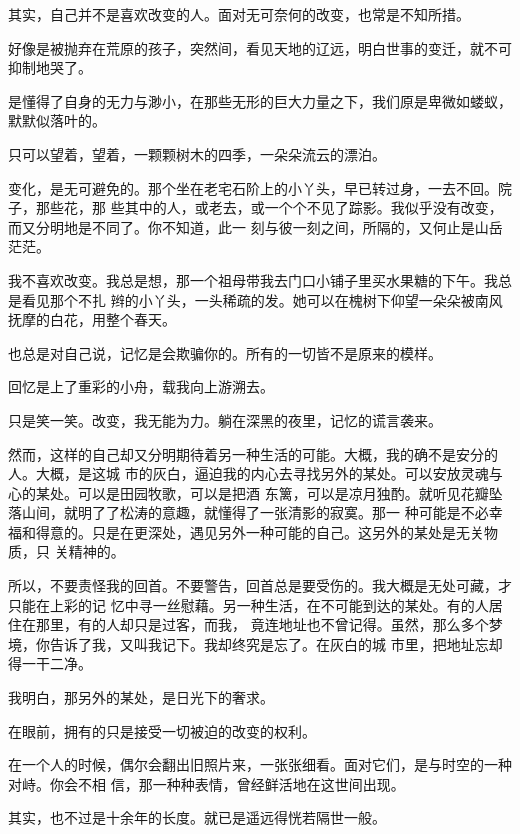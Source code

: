 
		其实，自己并不是喜欢改变的人。面对无可奈何的改变，也常是不知所措。

		好像是被抛弃在荒原的孩子，突然间，看见天地的辽远，明白世事的变迁，就不可抑制地哭了。

		是懂得了自身的无力与渺小，在那些无形的巨大力量之下，我们原是卑微如蝼蚁，默默似落叶的。

		只可以望着，望着，一颗颗树木的四季，一朵朵流云的漂泊。

		变化，是无可避免的。那个坐在老宅石阶上的小丫头，早已转过身，一去不回。院子，那些花，那
	些其中的人，或老去，或一个个不见了踪影。我似乎没有改变，而又分明地是不同了。你不知道，此一
	刻与彼一刻之间，所隔的，又何止是山岳茫茫。

		我不喜欢改变。我总是想，那一个祖母带我去门口小铺子里买水果糖的下午。我总是看见那个不扎
	辫的小丫头，一头稀疏的发。她可以在槐树下仰望一朵朵被南风抚摩的白花，用整个春天。

		也总是对自己说，记忆是会欺骗你的。所有的一切皆不是原来的模样。

		回忆是上了重彩的小舟，载我向上游溯去。

		只是笑一笑。改变，我无能为力。躺在深黑的夜里，记忆的谎言袭来。

		然而，这样的自己却又分明期待着另一种生活的可能。大概，我的确不是安分的人。大概，是这城
	市的灰白，逼迫我的内心去寻找另外的某处。可以安放灵魂与心的某处。可以是田园牧歌，可以是把酒
	东篱，可以是凉月独酌。就听见花瓣坠落山间，就明了了松涛的意趣，就懂得了一张清影的寂寞。那一
	种可能是不必幸福和得意的。只是在更深处，遇见另外一种可能的自己。这另外的某处是无关物质，只
	关精神的。

		所以，不要责怪我的回首。不要警告，回首总是要受伤的。我大概是无处可藏，才只能在上彩的记
	忆中寻一丝慰藉。另一种生活，在不可能到达的某处。有的人居住在那里，有的人却只是过客，而我，
	竟连地址也不曾记得。虽然，那么多个梦境，你告诉了我，又叫我记下。我却终究是忘了。在灰白的城
	市里，把地址忘却得一干二净。

		我明白，那另外的某处，是日光下的奢求。

		在眼前，拥有的只是接受一切被迫的改变的权利。

	\endwriting



		在一个人的时候，偶尔会翻出旧照片来，一张张细看。面对它们，是与时空的一种对峙。你会不相
	信，那一种种表情，曾经鲜活地在这世间出现。

		其实，也不过是十余年的长度。就已是遥远得恍若隔世一般。

